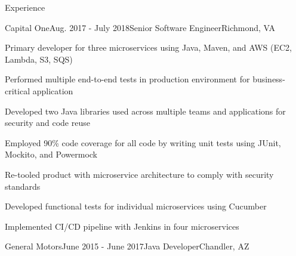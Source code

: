 \documentclass{resume} %
\begin{document}

\begin{rSection}{Experience}


\begin{rSubsection}{Capital One}{Aug. 2017 - July 2018}{Senior Software Engineer}{Richmond, VA}
 
\setlength{\itemindent}{.0in}\item 
Primary developer for three microservices using Java, Maven, and AWS (EC2, Lambda, S3, SQS)
\setlength{\itemindent}{.0in}\item 
Performed multiple end-to-end tests in production environment for business-critical application
\setlength{\itemindent}{.0in}\item 
Developed two Java libraries used across multiple teams and applications for security and code reuse
\setlength{\itemindent}{.0in}\item 
Employed 90\% code coverage for all code by writing unit tests using JUnit, Mockito, and Powermock
\setlength{\itemindent}{.0in}\item 
Re-tooled product with microservice architecture to comply with security standards
\setlength{\itemindent}{.0in}\item
Developed functional tests for individual microservices using Cucumber
\setlength{\itemindent}{.0in}\item
Implemented CI/CD pipeline with Jenkins in four microservices

\end{rSubsection}

\begin{rSubsection}{General Motors}{June 2015 - June 2017}{Java Developer}{Chandler, AZ}


\end{rSubsection}
\end{rSection}
\end{document}
